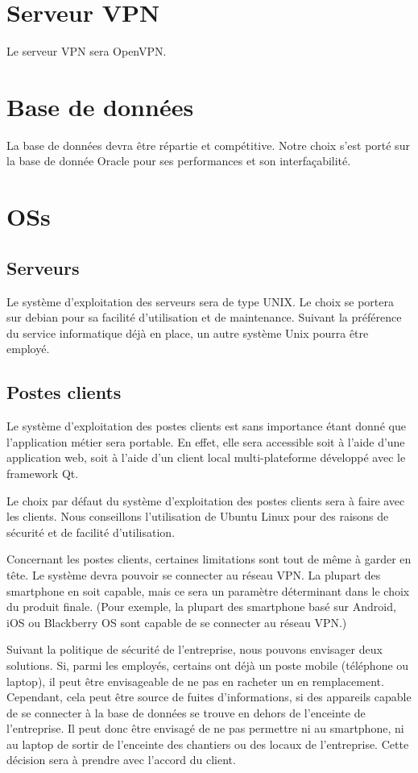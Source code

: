 \section{Serveur VPN}
    Le serveur VPN sera OpenVPN.

\section{Base de données}
    La base de données devra être répartie et compétitive.
    Notre choix s'est porté sur la base de donnée Oracle pour ses performances et son interfaçabilité.

\section{OSs}
    \subsection{Serveurs}
        Le système d'exploitation des serveurs sera de type UNIX.
        Le choix se portera sur debian pour sa facilité d'utilisation et de maintenance. Suivant la préférence du service informatique déjà en place, un autre système Unix pourra être employé.
    \subsection{Postes clients}
        Le système d'exploitation des postes clients est sans importance étant donné que l'application métier sera portable. En effet, elle sera accessible soit à l'aide d'une application web, soit à l'aide d'un client local multi-plateforme développé avec le framework Qt.

        Le choix par défaut du système d'exploitation des postes clients sera à faire avec les clients. Nous conseillons l'utilisation de Ubuntu Linux pour des raisons de sécurité et de facilité d'utilisation.

        Concernant les postes clients, certaines limitations sont tout de même à garder en tête. Le système devra pouvoir se connecter au réseau VPN. La plupart des smartphone en soit capable, mais ce sera un paramètre déterminant dans le choix du produit finale.
        (Pour exemple, la plupart des smartphone basé sur Android, iOS ou Blackberry OS sont capable de se connecter au réseau VPN.)

        Suivant la politique de sécurité de l'entreprise, nous pouvons envisager deux solutions.
        Si, parmi les employés, certains ont déjà un poste mobile (téléphone ou laptop), il peut être envisageable de ne pas en racheter un en remplacement. Cependant, cela peut être source de fuites d'informations, si des appareils capable de se connecter à la base de données se trouve en dehors de l'enceinte de l'entreprise.
        Il peut donc être envisagé de ne pas permettre ni au smartphone, ni au laptop de sortir de l'enceinte des chantiers ou des locaux de l'entreprise. Cette décision sera à prendre avec l'accord du client.
